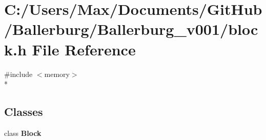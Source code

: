 \section{C\+:/\+Users/\+Max/\+Documents/\+Git\+Hub/\+Ballerburg/\+Ballerburg\+\_\+v001/block.h File Reference}
\label{block_8h}
{\ttfamily \#include $<$memory$>$}\\*
\subsection*{Classes}
\begin{DoxyCompactItemize}
\item 
class {\bf Block}
\end{DoxyCompactItemize}
